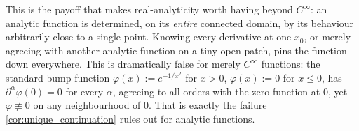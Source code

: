 \begin{remark}
This is the payoff that makes real-analyticity worth having beyond $C^\infty$: an analytic
function is determined, on its \emph{entire} connected domain, by its behaviour arbitrarily close
to a single point. Knowing every derivative at one $x_0$, or merely agreeing with another
analytic function on a tiny open patch, pins the function down everywhere. This is dramatically
false for merely $C^\infty$ functions: the standard bump function
$\varphi(x) := e^{-1/x^2}$ for $x>0$, $\varphi(x):=0$ for $x\leq0$, has $\partial^\alpha
\varphi(0) = 0$ for every $\alpha$, agreeing to all orders with the zero function at $0$, yet
$\varphi \not\equiv 0$ on any neighbourhood of $0$. That is exactly the failure
\cref{cor:unique_continuation} rules out for analytic functions.
\end{remark}
